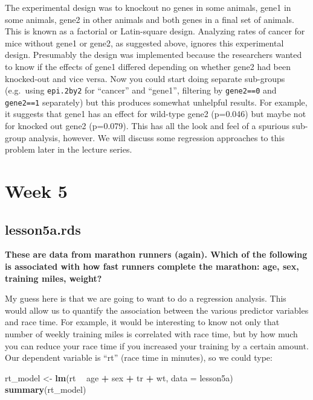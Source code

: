 \documentclass[]{book}
\newenvironment{Shaded}{\begin{snugshade}}{\end{snugshade}}
\newcommand{\DataTypeTok}[1]{\textcolor[rgb]{0.13,0.29,0.53}{#1}}
\newcommand{\KeywordTok}[1]{\textcolor[rgb]{0.13,0.29,0.53}{\textbf{#1}}}
\newcommand{\NormalTok}[1]{#1}
\newcommand{\OperatorTok}[1]{\textcolor[rgb]{0.81,0.36,0.00}{\textbf{#1}}}
\newcommand{\StringTok}[1]{\textcolor[rgb]{0.31,0.60,0.02}{#1}}
\begin{document}
The experimental design was to knockout no genes in some animals, gene1 in some animals, gene2 in other animals and both genes in a final set of animals. This is known as a factorial or Latin-square design. Analyzing rates of cancer for mice without gene1 or gene2, as suggested above, ignores this experimental design. Presumably the design was implemented because the researchers wanted to know if the effects of gene1 differed depending on whether gene2 had been knocked-out and vice versa. Now you could start doing separate sub-groups (e.g.~using \texttt{epi.2by2} for ``cancer'' and ``gene1'', filtering by \texttt{gene2==0} and \texttt{gene2==1} separately) but this produces somewhat unhelpful results. For example, it suggests that gene1 has an effect for wild-type gene2 (p=0.046) but maybe not for knocked out gene2 (p=0.079). This has all the look and feel of a spurious sub-group analysis, however. We will discuss some regression approaches to this problem later in the lecture series.

\hypertarget{week-5-1}{%
\section{Week 5}\label{week-5-1}}

\hypertarget{lesson5a.rds}{%
\subsection{lesson5a.rds}\label{lesson5a.rds}}

\textbf{These are data from marathon runners (again). Which of the following is associated with how fast runners complete the marathon: age, sex, training miles, weight?}

My guess here is that we are going to want to do a regression analysis. This would allow us to quantify the association between the various predictor variables and race time. For example, it would be interesting to know not only that number of weekly training miles is correlated with race time, but by how much you can reduce your race time if you increased your training by a certain amount. Our dependent variable is ``rt'' (race time in minutes), so we could type:

\begin{Shaded}
\begin{Highlighting}[]
\NormalTok{rt_model <-}\StringTok{ }\KeywordTok{lm}\NormalTok{(rt }\OperatorTok{~}\StringTok{ }\NormalTok{age }\OperatorTok{+}\StringTok{ }\NormalTok{sex }\OperatorTok{+}\StringTok{ }\NormalTok{tr }\OperatorTok{+}\StringTok{ }\NormalTok{wt, }\DataTypeTok{data =}\NormalTok{ lesson5a)}
\KeywordTok{summary}\NormalTok{(rt_model)}
\end{Highlighting}
\end{Shaded}
\end{document}
